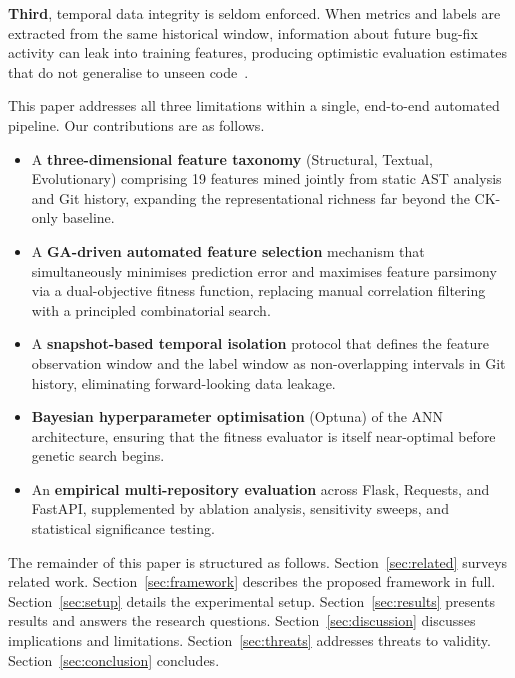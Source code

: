 \documentclass[11pt,a4paper]{article}
\begin{document}
\textbf{Third}, temporal data integrity is seldom enforced. When metrics and
labels are extracted from the same historical window, information about future
bug-fix activity can leak into training features, producing optimistic evaluation
estimates that do not generalise to unseen code~\cite{dambros2012}.

This paper addresses all three limitations within a single, end-to-end
automated pipeline. Our contributions are as follows.

\begin{itemize}
  \item A \textbf{three-dimensional feature taxonomy} (Structural,
        Textual, Evolutionary) comprising 19 features mined jointly from
        static AST analysis and Git history, expanding the representational
        richness far beyond the CK-only baseline.
  \item A \textbf{GA-driven automated feature selection} mechanism that
        simultaneously minimises prediction error and maximises feature
        parsimony via a dual-objective fitness function, replacing manual
        correlation filtering with a principled combinatorial search.
  \item A \textbf{snapshot-based temporal isolation} protocol that defines
        the feature observation window and the label window as non-overlapping
        intervals in Git history, eliminating forward-looking data leakage.
  \item \textbf{Bayesian hyperparameter optimisation} (Optuna) of the ANN
        architecture, ensuring that the fitness evaluator is itself near-optimal
        before genetic search begins.
  \item An \textbf{empirical multi-repository evaluation} across Flask,
        Requests, and FastAPI, supplemented by ablation analysis, sensitivity
        sweeps, and statistical significance testing.
\end{itemize}

The remainder of this paper is structured as follows.
Section~\ref{sec:related} surveys related work. Section~\ref{sec:framework}
describes the proposed framework in full. Section~\ref{sec:setup} details the
experimental setup. Section~\ref{sec:results} presents results and answers the
research questions. Section~\ref{sec:discussion} discusses implications and
limitations. Section~\ref{sec:threats} addresses threats to validity. Section~\ref{sec:conclusion}
concludes.

\end{document}
